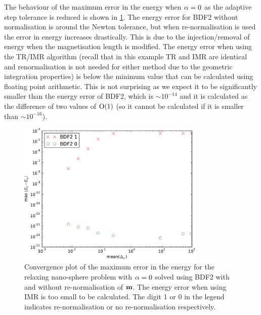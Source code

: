 The behaviour of the maximum error in the energy when $\alpha = 0$ as the adaptive step tolerance is reduced is shown in \cref{fig:energy-aimr-ode}.
The energy error for BDF2 without normalisation is around the Newton tolerance, but when re-normalisation is used the error in energy increases drastically.
This is due to the injection/removal of energy when the magnetisation length is modified.
The energy error when using the TR/IMR algorithm (recall that in this example TR and IMR are identical and renormalisation is not needed for either method due to the geometric integration properties) is below the minimum value that can be calculated using floating point arithmetic.
This is not surprising as we expect it to be significantly smaller than the energy error of BDF2, which is $\sim 10^{-14}$ and it is calculated as the difference of two values of $\mathrm{O}{\left( 1 \right)}$ (so it cannot be calculated if it is smaller than $\sim 10^{-16}$).


\begin{figure}
  \centering
  \includegraphics[width=0.8\textwidth]{plots/ode_llg_adaptive_energy/maxabsofenergychangevsmeanofdts}
  \caption{Convergence plot of the maximum error in the energy for the relaxing nano-sphere problem with $\alpha = 0$ solved using BDF2 with and without re-normalisation of $\boldsymbol{\mathrm{m}}$.
The energy error when using IMR is too small to be calculated.
The digit 1 or 0 in the legend indicates re-normalisation or no re-normalisation respectively.
}
  \label{fig:energy-aimr-ode}
\end{figure}

